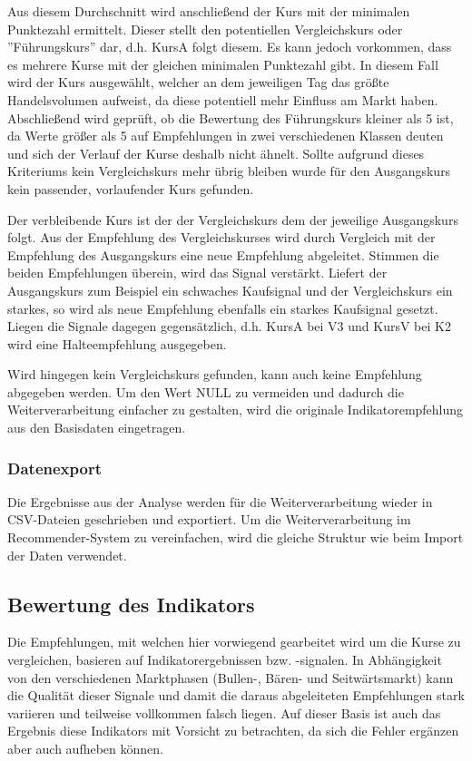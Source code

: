 Aus diesem Durchschnitt wird anschließend der Kurs mit der minimalen Punktezahl ermittelt. Dieser stellt den potentiellen Vergleichskurs oder ''Führungskurs'' dar, d.h. KursA folgt diesem. Es kann jedoch vorkommen, dass es mehrere Kurse mit der gleichen minimalen Punktezahl gibt. In diesem Fall wird der Kurs ausgewählt, welcher an dem jeweiligen Tag das größte Handelsvolumen aufweist, da diese potentiell mehr Einfluss am Markt haben. Abschließend wird geprüft, ob die Bewertung des Führungskurs kleiner als 5 ist, da Werte größer als 5 auf Empfehlungen in zwei verschiedenen Klassen deuten und sich der Verlauf der Kurse deshalb nicht ähnelt. Sollte aufgrund dieses Kriteriums kein Vergleichskurs mehr übrig bleiben wurde für den Ausgangskurs kein passender, vorlaufender Kurs gefunden.  

Der verbleibende Kurs ist der der Vergleichskurs dem der jeweilige Ausgangskurs folgt. Aus der Empfehlung des Vergleichskurses wird durch Vergleich mit der Empfehlung des Ausgangskurs eine neue Empfehlung abgeleitet. Stimmen die beiden Empfehlungen überein, wird das Signal verstärkt. Liefert der Ausgangskurs zum Beispiel ein schwaches Kaufsignal und der Vergleichskurs ein starkes, so wird als neue Empfehlung ebenfalls ein starkes Kaufsignal gesetzt. Liegen die Signale dagegen gegensätzlich, d.h. KursA bei V3 und KursV bei K2 wird eine Halteempfehlung ausgegeben.

Wird hingegen kein Vergleichskurs gefunden, kann auch keine Empfehlung abgegeben werden. Um den Wert NULL zu vermeiden und dadurch die Weiterverarbeitung einfacher zu gestalten, wird die originale Indikatorempfehlung aus den Basisdaten eingetragen.  

\subsubsection{Datenexport}
Die Ergebnisse aus der Analyse werden für die Weiterverarbeitung wieder in CSV-Dateien geschrieben und exportiert. Um die Weiterverarbeitung im Recommender-System zu vereinfachen, wird die gleiche Struktur wie beim Import der Daten verwendet. 

\subsection{Bewertung des Indikators}
Die Empfehlungen, mit welchen hier vorwiegend gearbeitet wird um die Kurse zu vergleichen, basieren auf Indikatorergebnissen bzw. -signalen. In Abhängigkeit von den verschiedenen Marktphasen (Bullen-, Bären- und Seitwärtsmarkt) kann die Qualität dieser Signale und damit die daraus abgeleiteten Empfehlungen stark variieren und teilweise vollkommen falsch liegen. Auf dieser Basis ist auch das Ergebnis diese Indikators mit Vorsicht zu betrachten, da sich die Fehler ergänzen aber auch aufheben können. 



